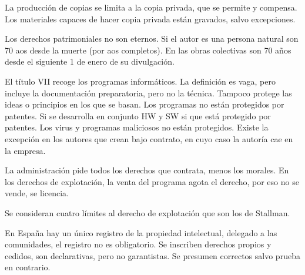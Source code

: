     La producción de copias se limita a la copia privada, que se permite y compensa. Los materiales capaces de hacer copia privada están gravados, salvo excepciones.

    Los derechos patrimoniales no son eternos. Si el autor es una persona natural son 70 aos desde la muerte (por aos completos). En las obras colectivas son 70 años desde el siguiente 1 de enero de su divulgación.

    El título VII recoge los programas informáticos. La definición es vaga, pero incluye la documentación preparatoria, pero no la técnica. Tampoco protege las ideas o principios en los que se basan. Los programas no están protegidos por patentes. Si se desarrolla en conjunto HW y SW si que está protegido por patentes. Los virus y programas maliciosos no están protegidos. Existe la excepción en los autores que crean bajo contrato, en cuyo caso la autoría cae en la empresa.

    La administración pide todos los derechos que contrata, menos los morales. En los derechos de explotación, la venta del programa agota el derecho, por eso no se vende, se licencia. 

    Se consideran cuatro límites al derecho de explotación que son los de Stallman.

    En España hay un único registro de la propiedad intelectual, delegado a las comunidades, el registro no es obligatorio. Se inscriben derechos propios y cedidos, son declarativas, pero no garantistas. Se presumen correctos salvo prueba en contrario.